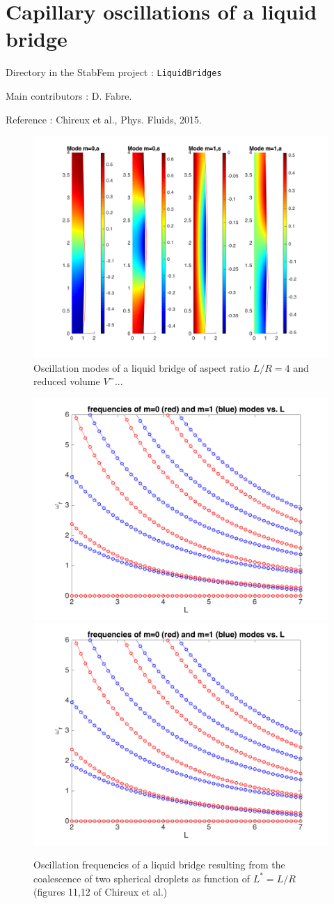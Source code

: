 
\chapter{Capillary oscillations of a liquid bridge}

\begin{description}
\item{Directory in the StabFem project :}  \texttt{LiquidBridges}
\item{Main contributors :} D. Fabre.
\item{Reference :} Chireux et al., Phys. Fluids, 2015.
\end{description}


\begin{figure}
\includegraphics[width=.8\linewidth]{../../CASES_STABLE/LiquidBridges/FIGURES/Bridges_NV_Eigenmodes_phi_cyl_L3_5.png}
\caption{Oscillation modes of a liquid bridge of aspect ratio $L/R=4$ and reduced volume $V^ =$...}
\label{Bridges_NV_Eigenmodes_phi_cyl_L3_5}
\end{figure}

\begin{figure}
\includegraphics[width=.45\linewidth]{../../CASES_STABLE/LiquidBridges/FIGURES/Bridges_NV_coal_omega.png}
\includegraphics[width=.45\linewidth]{../../CASES_STABLE/LiquidBridges/FIGURES/Bridges_NV_coal_omega.png}
\caption{Oscillation frequencies of a liquid bridge resulting from the coalescence of two spherical droplets
as function of $L^* =L/R$
(figures 11,12 of Chireux et al.)
}
\label{Bridges_NV_Eigenmodes_phi_cyl_L3_5}
\end{figure}
 